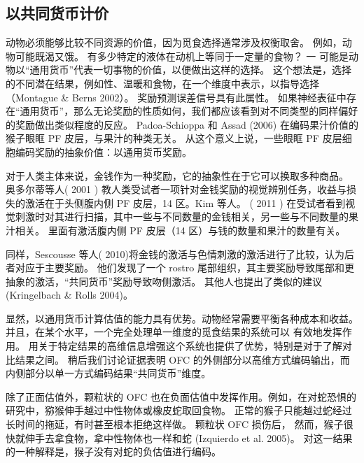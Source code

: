 \subsection{以共同货币计价}
动物必须能够比较不同资源的价值，因为觅食选择通常涉及权衡取舍。 例如，动物可能既渴又饿。 有多少特定的液体在动机上等同于一定量的食物？ 一
可能是动物以“通用货币”代表一切事物的价值，以便做出这样的选择。 这个想法是，选择的不同潜在结果，例如性、温暖和食物，在一个维度中表示，以指导选择（Montague \& Berns 2002）。 奖励预测误差信号具有此属性。
如果神经表征中存在“通用货币”，那么无论奖励的性质如何，我们都应该看到对不同类型的同样偏好的奖励做出类似程度的反应。 Padoa-Schioppa 和 Assad (2006) 在编码果汁价值的猴子眼眶 PF 皮层，与果汁的种类无关。 从这个意义上说，一些眼眶 PF 皮层细胞编码奖励的抽象价值：以通用货币奖励。\par
对于人类主体来说，金钱作为一种奖励，它的抽象性在于它可以换取多种商品。 奥多尔蒂等人( 2001 ) 教人类受试者一项针对金钱奖励的视觉辨别任务，收益与损失的激活在于头侧腹内侧 PF 皮层，14 区。Kim 等人。 ( 2011 ) 在受试者看到视觉刺激时对其进行扫描，其中一些与不同数量的金钱相关，另一些与不同数量的果汁相关。 里面有激活腹内侧 PF 皮层（14 区）与钱的数量和果汁的数量有关。\par
同样，Sescousse 等人( 2010)将金钱的激活与色情刺激的激活进行了比较，认为后者对应于主要奖励。 他们发现了一个 rostro 尾部组织，其主要奖励导致尾部和更抽象的激活，“共同货币”奖励导致吻侧激活。 其他人也提出了类似的建议 (Kringelbach \& Rolls 2004)。\par
显然，以通用货币计算估值的能力具有优势。动物经常需要平衡各种成本和收益。 并且，在某个水平，一个完全处理单一维度的觅食结果的系统可以
有效地发挥作用。 用关于特定结果的高维信息增强这个系统也提供了优势，特别是对于了解对比结果之间。 稍后我们讨论证据表明 OFC 的外侧部分以高维方式编码输出，而内侧部分以单一方式编码结果“共同货币”维度。\par
除了正面估值外，颗粒状的 OFC 也在负面估值中发挥作用。例如，在对蛇恐惧的研究中，猕猴伸手越过中性物体或橡皮蛇取回食物。 正常的猴子只能越过蛇经过长时间的拖延，有时甚至根本拒绝这样做。 颗粒状 OFC 损伤后，
然而，猴子很快就伸手去拿食物，拿中性物体也一样和蛇 (Izquierdo et al. 2005)。 对这一结果的一种解释是，猴子没有对蛇的负估值进行编码。
\par

